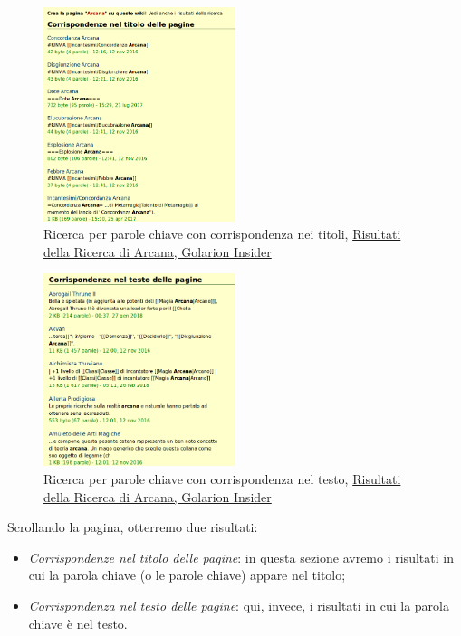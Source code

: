 \begin{figure}[hbt]
    \centering
    \includegraphics[width=0.5\textwidth]{img/ricerca4.png} 
    \caption{Ricerca per parole chiave con corrispondenza nei titoli, \href{http://golarion.altervista.org/index.php?title=Speciale&search=Arcana&go=Vai}{Risultati della Ricerca di Arcana, Golarion Insider}}
\end{figure}

\begin{figure}[!hbt]
    \centering
    \includegraphics[width=0.5\textwidth]{img/ricerca5.png} 
    \caption{Ricerca per parole chiave con corrispondenza nel testo, \href{http://golarion.altervista.org/index.php?title=Speciale&search=Arcana&go=Vai}{Risultati della Ricerca di Arcana, Golarion Insider}}
\end{figure} 

Scrollando la pagina, otterremo due risultati:
\begin{itemize}
    \item \emph{Corrispondenze nel titolo delle pagine}: in questa sezione avremo i risultati in cui la parola chiave (o le parole chiave)
    appare nel titolo;
    \item \emph{Corrispondenza nel testo delle pagine}: qui, invece, i risultati in cui la parola chiave è nel testo.
\end{itemize}

